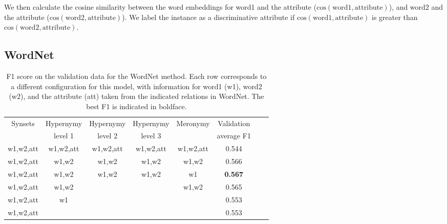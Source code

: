\documentclass[11pt,a4paper]{article}
\begin{document}
We then calculate the cosine similarity between the word embeddings
for word1 and the attribute
($\mathrm{cos}(\mathrm{word1},\mathrm{attribute})$), and word2 and the
attribute ($\mathrm{cos}(\mathrm{word2},\mathrm{attribute})$). We
label the instance as a discriminative attribute if
$\mathrm{cos}(\mathrm{word1},\mathrm{attribute})$ is greater than
$\mathrm{cos}(\mathrm{word2},\mathrm{attribute})$.


\subsection{WordNet\label{sec:wordnet}}

\begin{table*}
\centering
{%
  \begin{tabular}{ |c|c|c|c|c|c|c|c|} 
    \hline

    \multirow{2}{*}{Synsets} & Hypernymy & Hypernymy & Hypernymy &
    \multirow{2}{*}{Meronymy} & {Validation} \\ 

 & level 1 & level 2 & level 3 & & average F1 \\
    \hline
 w1,w2,att & w1,w2,att & w1,w2,att & w1,w2,att & w1,w2,att & 0.544\\

 w1,w2,att & w1,w2 & w1,w2 & w1,w2 & w1,w2 & 0.566\\

 w1,w2,att & w1,w2 & w1,w2 & w1,w2 & w1 & \textbf{0.567} \\

 w1,w2,att & w1,w2 &  &  & w1,w2 & 0.565 \\

 w1,w2,att & w1 &  &  &  & 0.553 \\

 w1,w2,att & &  &  &  & 0.553 \\

    \hline 
	\end{tabular}%
}
\caption{F1 score on the validation data for the WordNet method. Each
  row corresponds to a different configuration for this model, with
  information for word1 (w1), word2 (w2), and the attribute (att)
  taken from the indicated relations in WordNet. The best F1 is
  indicated in boldface.\label{tab:wn}}
\end{table*}
\end{document}
